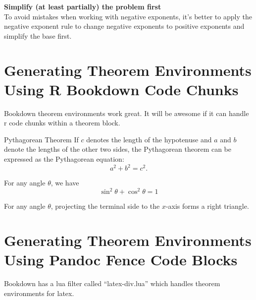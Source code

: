 \documentclass[en,11pt]{elegantbook}
\newcommand{\size}[2]{{\fontsize{#1}{0}\selectfont#2}}
\newcommand{\tipname}{提示}
\newcommand{\tipname}{Tips}
\newenvironment{rmdtip}{
	\vspace*{0.5\baselineskip}
	\par\noindent
	\makebox[-3pt][r]{\color{red!90}\size{12}{\HandRight}\,\,}
    \begin{tcolorbox}[
    enhanced,
    title={\textbf{\color{second}\tipname}},
    title style={left color=blue!10!green!20!white,right color=yellow!20!blue!20!white},
    colback=cyan!10!white,
    ]
    \sffamily
}{
    \end{tcolorbox}
    \par\ignorespacesafterend
}
\let\BeginKnitrBlock\begin \let\EndKnitrBlock\end
\begin{document}
\begin{rmdtip}

\textbf{Simplify (at least partially) the problem first}\\
To avoid mistakes when working with negative exponents, it's better to apply the negative exponent rule to change negative exponents to positive exponents and simplify the base first.

\end{rmdtip}

\newpage

\hypertarget{generating-theorem-environments-using-r-bookdown-code-chunks}{%
\section{Generating Theorem Environments Using R Bookdown Code Chunks}\label{generating-theorem-environments-using-r-bookdown-code-chunks}}

Bookdown theorem environments work great. It will be awesome if it can handle r code chunks within a theorem block.

\BeginKnitrBlock{theorem}{Pythagorean Theorem}{}
\protect\hypertarget{thm:unnamed-chunk-3}{}{\label{thm:unnamed-chunk-3} {} }
If \(c\) denotes the length of the hypotenuse and \(a\) and \(b\) denote the lengths of the other two sides, the Pythagorean theorem can be expressed as the Pythagorean equation:
\[a^2+b^2=c^2.\]
\EndKnitrBlock{theorem}

\BeginKnitrBlock{corollary}{}{}
\protect\hypertarget{cor:unnamed-chunk-4}{}{\label{cor:unnamed-chunk-4} }
For any angle \(\theta\), we have
\[
\sin^2\theta+\cos^2\theta=1
\]
\EndKnitrBlock{corollary}

\BeginKnitrBlock{lemma}{}{}
\protect\hypertarget{lem:unnamed-chunk-5}{}{\label{lem:unnamed-chunk-5} }
For any angle \(\theta\), projecting the terminal side to the \(x\)-axis forms a right triangle.
\EndKnitrBlock{lemma}

\newpage

\hypertarget{generating-theorem-environments-using-pandoc-fence-code-blocks}{%
\section{Generating Theorem Environments Using Pandoc Fence Code Blocks}\label{generating-theorem-environments-using-pandoc-fence-code-blocks}}

Bookdown has a lua filter called ``latex-div.lua'' which handles theorem environments for latex.
\end{document}
